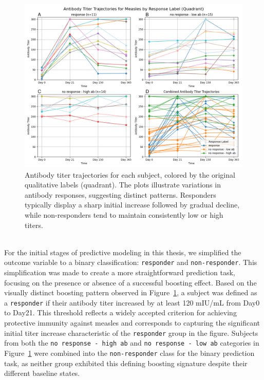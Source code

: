 \documentclass[12pt,a4paper]{report}
\begin{document}
\begin{figure}[h!]
  \centering
  \hspace*{-0.5cm}
  \includegraphics[width=1.05\textwidth]{images/Antibody_Titer_Trajectories_for_Measles_by_Original_Label_(Quadrant).png}
  \caption[Antibody Titer Trajectories by Original Label (Quadrant)]{Antibody titer trajectories for each subject, colored by the original qualitative labels (quadrant). The plots illustrate variations in antibody responses, suggesting distinct patterns. Responders typically display a sharp initial increase followed by gradual decline, while non-responders tend to maintain consistently low or high titers.}
  \label{fig:titer_original_label}
\end{figure}
\\
\noindent
For the initial stages of predictive modeling in this thesis, we simplified the outcome variable to a binary classification: \texttt{responder} and \texttt{non-responder}. This simplification was made to create a more straightforward prediction task, focusing on the presence or absence of a successful boosting effect. Based on the visually distinct boosting pattern observed in Figure~\ref{fig:titer_original_label}, a subject was defined as a \texttt{responder} if their antibody titer increased by at least 120 mIU/mL from Day0 to Day21. This threshold reflects a widely accepted criterion for achieving protective immunity against measles \cite{chen1990measles} and corresponds to capturing the significant initial titer increase characteristic of the \texttt{responder} group in the figure. Subjects from both the \texttt{no response - high ab} and \texttt{no response - low ab} categories in Figure~\ref{fig:titer_original_label} were combined into the \texttt{non-responder} class for the binary prediction task, as neither group exhibited this defining boosting signature despite their different baseline states.
\end{document}
